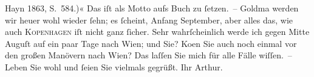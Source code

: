\begin{ledgroupsized}[t]{13cm}
{{{{                        Hayn}{ }1863, S. 584.)}}}\label{K_L00467_1h}« Das iſt als Motto aufs Buch zu
               ſetzen. –\pend
           \pstart
           Goldma{\geminationn} werden wir heuer wohl wieder ſehn; es ſcheint, Anfang September,
               aber alles das, wie auch \textsc{Kopenhagen} iſt nicht ganz ſicher. Sehr wahrſcheinlich werde ich gegen Mitte
                  Auguſt auf ein paar Tage nach Wien; und
               Sie? Ko{\geminationm}en Sie auch noch einmal vor den großen Manövern
               nach Wien? Das {\pb}laſſen
               Sie mich für alle Fälle wiſſen. –\pend
           \pstart
           Leben Sie wohl und ſeien Sie vielmals gegrüßt.\pend
           \pstart Ihr \spacefill\mbox{Arthur.}\pend{}\endnumbering{}\end{ledgroupsized}  \newcommand{\dateiname}{L00467}\newcommand{\titel}{Arthur Schnitzler an Hugo von Hofmannsthal, 28. 7. 1895}\newcommand{\editorInnen}{Martin Anton Müller und Gerd-Hermann Susen}
            \footnotesize
\begin{ledgroupsized}[t]{11.5cm}
\end{ledgroupsized}
         
      
